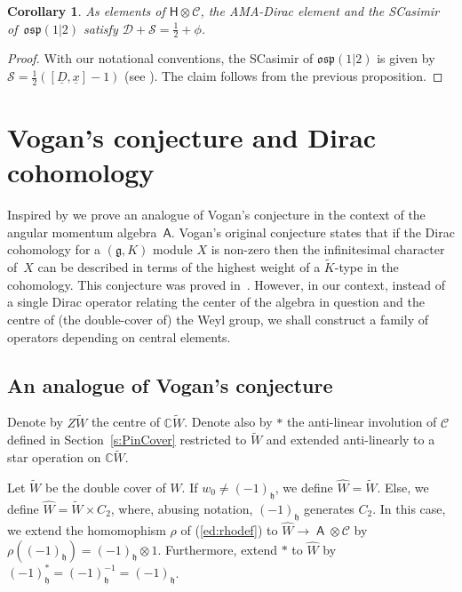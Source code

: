 \documentclass[10pt,a4paper]{amsart}
\numberwithin{equation}{section}
\newtheorem{Corollary}[Theorem]{Corollary}
\newcommand{\fh}{\mathfrak{h}}
\newcommand{\bbc}{\mathbb{C}}
\newcommand{\Cc}{\mathcal{C}}
\newcommand{\ux}{\underline{x}}
\newcommand{\uD}{\underline{D}}
\DeclareMathOperator{\ama}{\mathsf{A}}
\begin{document}
\begin{Corollary}
As elements of $\mathsf{H}\otimes\mathcal{C}$, the AMA-Dirac element and the SCasimir of~$\mathfrak{osp}(1|2)$ satisfy
$\mathcal{D} +\mathcal{S}=\frac{1}{2} + \phi$.
\end{Corollary}

\begin{proof}
With our notational conventions, the SCasimir of $\mathfrak{osp}(1|2)$ is given by
$\mathcal{S} = \tfrac{1}{2}([\uD,\ux] - 1)$ (see \cite[equation~(3.3)]{DOV18a}). The claim follows from the previous proposition.
\end{proof}

\section{Vogan's conjecture and Dirac cohomology}\label{s:Cohomology}

Inspired by \cite{BCT12} we prove an analogue of Vogan's conjecture in the context of the angular momentum algebra~$\mathsf{A}$. Vogan's original conjecture states that if the Dirac cohomology for a $(\mathfrak{g},K)$ module $X$ is non-zero then the infinitesimal character of~$X$ can be described in terms of the highest weight of a $\tilde{K}$-type in the cohomology. This conjecture was proved in~\cite{HP02}. However, in our context, instead of a single Dirac operator relating the center of the algebra in question and the centre of (the double-cover of) the Weyl group, we shall construct a family of operators depending on central elements.

\subsection{An analogue of Vogan's conjecture}
Denote by $Z\tilde W$ the centre of $\bbc \tilde W$. Denote also by $\ast$ the anti-linear involution of $\Cc$ defined in Section~\ref{s:PinCover} restricted to $\tilde W$ and extended anti-linearly to a star operation on $\bbc \tilde{W}$.

\begin{Definition}\label{d:hatW} Let $\tilde{W}$ be the double cover of $W$. If $w_0 \neq(-1)_\fh$, we define $\hat{W} = \tilde{W}$. Else, we define $\hat{W} = \tilde{W} \times C_2$, where, abusing notation, $(-1)_\fh$ generates $C_2$. In this case, we extend the homomophism $\rho$ of (\ref{ed:rhodef}) to $\hat{W} \to \ama \otimes \Cc$ by $\rho((-1)_\fh) = (-1)_\fh \otimes 1$. Furthermore, extend $*$ to $\hat{W}$ by $(-1)_\fh^*=(-1)_\fh^{-1} = (-1)_\fh$.
\end{Definition}
\end{document}

